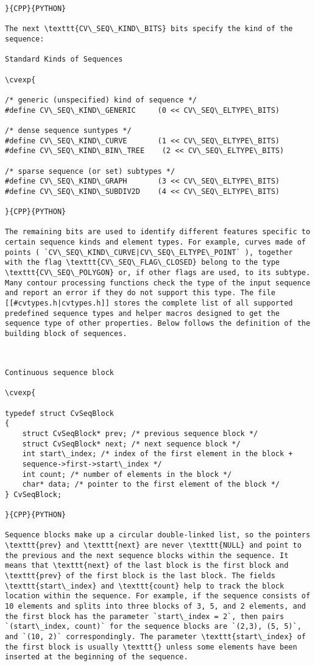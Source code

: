 \begin{verbatim}
}{CPP}{PYTHON}

The next \texttt{CV\_SEQ\_KIND\_BITS} bits specify the kind of the sequence:

Standard Kinds of Sequences

\cvexp{

/* generic (unspecified) kind of sequence */
#define CV\_SEQ\_KIND\_GENERIC     (0 << CV\_SEQ\_ELTYPE\_BITS)

/* dense sequence suntypes */
#define CV\_SEQ\_KIND\_CURVE       (1 << CV\_SEQ\_ELTYPE\_BITS)
#define CV\_SEQ\_KIND\_BIN\_TREE    (2 << CV\_SEQ\_ELTYPE\_BITS)

/* sparse sequence (or set) subtypes */
#define CV\_SEQ\_KIND\_GRAPH       (3 << CV\_SEQ\_ELTYPE\_BITS)
#define CV\_SEQ\_KIND\_SUBDIV2D    (4 << CV\_SEQ\_ELTYPE\_BITS)

}{CPP}{PYTHON}

The remaining bits are used to identify different features specific to certain sequence kinds and element types. For example, curves made of points ( `CV\_SEQ\_KIND\_CURVE|CV\_SEQ\_ELTYPE\_POINT` ), together with the flag \texttt{CV\_SEQ\_FLAG\_CLOSED} belong to the type \texttt{CV\_SEQ\_POLYGON} or, if other flags are used, to its subtype. Many contour processing functions check the type of the input sequence and report an error if they do not support this type. The file [[#cvtypes.h|cvtypes.h]] stores the complete list of all supported predefined sequence types and helper macros designed to get the sequence type of other properties. Below follows the definition of the building block of sequences.


\end{verbatim}
\begin{verbatim}

Continuous sequence block

\cvexp{

typedef struct CvSeqBlock
{
    struct CvSeqBlock* prev; /* previous sequence block */
    struct CvSeqBlock* next; /* next sequence block */
    int start\_index; /* index of the first element in the block +
    sequence->first->start\_index */
    int count; /* number of elements in the block */
    char* data; /* pointer to the first element of the block */
} CvSeqBlock;

}{CPP}{PYTHON}

Sequence blocks make up a circular double-linked list, so the pointers \texttt{prev} and \texttt{next} are never \texttt{NULL} and point to the previous and the next sequence blocks within the sequence. It means that \texttt{next} of the last block is the first block and \texttt{prev} of the first block is the last block. The fields \texttt{start\_index} and \texttt{count} help to track the block location within the sequence. For example, if the sequence consists of 10 elements and splits into three blocks of 3, 5, and 2 elements, and the first block has the parameter `start\_index = 2`, then pairs `(start\_index, count)` for the sequence blocks are `(2,3), (5, 5)`, and `(10, 2)` correspondingly. The parameter \texttt{start\_index} of the first block is usually \texttt{} unless some elements have been inserted at the beginning of the sequence.


\end{verbatim}

